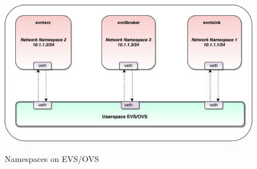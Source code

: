  \begin{figure}[H]
	\centering
	\caption{Namespaces on EVS/OVS}
	\includegraphics[height=7cm]{nsovs.pdf}
\end{figure}


